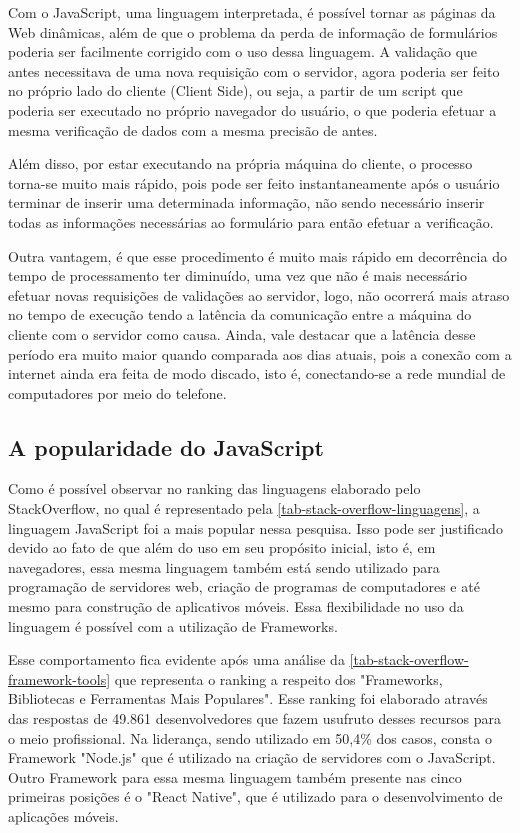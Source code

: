 Com o JavaScript, uma linguagem interpretada, é possível tornar as páginas da Web dinâmicas, além de que o problema da perda de informação de formulários poderia ser facilmente corrigido com o uso dessa linguagem. A validação que antes necessitava de uma nova requisição com o servidor, agora poderia ser feito no próprio lado do cliente (Client Side), ou seja, a partir de um script que poderia ser executado no próprio navegador do usuário, o que poderia efetuar a mesma verificação de dados com a mesma precisão de antes.

Além disso, por estar executando na própria máquina do cliente, o processo torna-se muito mais rápido, pois pode ser feito instantaneamente após o usuário terminar de inserir uma determinada informação, não sendo necessário inserir todas as informações necessárias ao formulário para então efetuar a verificação.

Outra vantagem, é que esse procedimento é muito mais rápido em decorrência do tempo de processamento ter diminuído, uma vez que não é mais necessário efetuar novas requisições de validações ao servidor, logo, não ocorrerá mais atraso no tempo de execução tendo a latência da comunicação entre a máquina do cliente com o servidor como causa. Ainda, vale destacar que a latência desse período era muito maior quando comparada aos dias atuais, pois a conexão com a internet ainda era feita de modo discado, isto é, conectando-se a rede mundial de computadores por meio do telefone.

\subsection{A popularidade do JavaScript}
\label{secao-javascript-popularidade}

Como é possível observar no ranking das linguagens elaborado pelo StackOverflow, no qual é representado pela \autoref{tab-stack-overflow-linguagens}, a linguagem JavaScript foi a mais popular nessa pesquisa. Isso pode ser justificado devido ao fato de que além do uso em seu propósito inicial, isto é, em navegadores, essa mesma linguagem também está sendo utilizado para programação de servidores web, criação de programas de computadores e até mesmo para construção de aplicativos móveis. Essa flexibilidade no uso da linguagem é possível com a utilização de Frameworks.

Esse comportamento fica evidente após uma análise da \autoref{tab-stack-overflow-framework-tools} que representa o ranking a respeito dos "Frameworks, Bibliotecas e Ferramentas Mais Populares". Esse ranking foi elaborado através das respostas de 49.861 desenvolvedores que fazem usufruto desses recursos para o meio profissional. Na liderança, sendo utilizado em 50,4\% dos casos, consta o Framework "Node.js" que é utilizado na criação de servidores com o JavaScript. Outro Framework para essa mesma linguagem também presente nas cinco primeiras posições é o "React Native", que é utilizado para o desenvolvimento de aplicações móveis.

